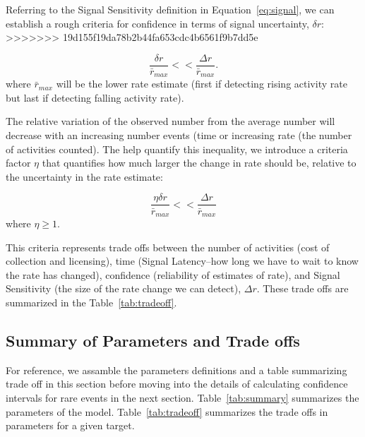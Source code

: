 \documentclass{article}
\begin{document}
Referring to the Signal Sensitivity definition in Equation~\ref{eq:signal}, we can establish a rough criteria for confidence in terms of signal uncertainty, $\delta r$: 
>>>>>>> 19d155f19da78b2b44fa653cdc4b6561f9b7dd5e

\begin{equation}
    \label{eq:criteria}
    \frac{\delta r}{\bar{r}_{max}} << \frac{\Delta r}{\bar{r}_{max}}.
\end{equation}
where $\bar{r}_{max}$ will be the lower rate estimate (first if detecting rising activity rate but last if detecting falling activity rate).

The relative variation of the observed number from the average number will decrease with an increasing number events (time or increasing rate (the number of activities counted). The help quantify this inequality, we introduce a criteria factor $\eta$ that quantifies how much larger the change in rate should be, relative to the uncertainty in the rate estimate:

\begin{equation}
    \label{eq:criteriaParam}
    \frac{\eta \delta r}{\bar{r}_{max}} << \frac{\Delta r}{\bar{r}_{max}}
\end{equation}
where $\eta \ge 1$.

This criteria represents trade offs between the number of activities (cost of collection and licensing), time (Signal Latency--how long we have to wait to know the rate has changed), confidence (reliability of estimates of rate), and Signal Sensitivity (the size of the rate change we can detect), $\Delta r$. These trade offs are summarized in the Table~\ref{tab:tradeoff}.

\subsection{Summary of Parameters and Trade offs}

For reference, we assamble the parameters definitions and a table summarizing trade off in this section before moving into the details of calculating confidence intervals for rare events in the next section.  Table~\ref{tab:summary} summarizes the parameters of the model. Table~\ref{tab:tradeoff} summarizes the trade offs in parameters for a given target.
\end{document}
